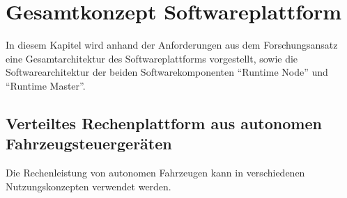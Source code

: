 \chapter{Gesamtkonzept Softwareplattform}

In diesem Kapitel wird anhand der Anforderungen aus dem Forschungsansatz eine Gesamtarchitektur des Softwareplattforms vorgestellt, sowie die Softwarearchitektur der beiden Softwarekomponenten \enquote{Runtime Node} und \enquote{Runtime Master}. 

\section{Verteiltes Rechenplattform aus autonomen Fahrzeugsteuergeräten}

Die Rechenleistung von autonomen Fahrzeugen kann in verschiedenen Nutzungskonzepten verwendet werden. 